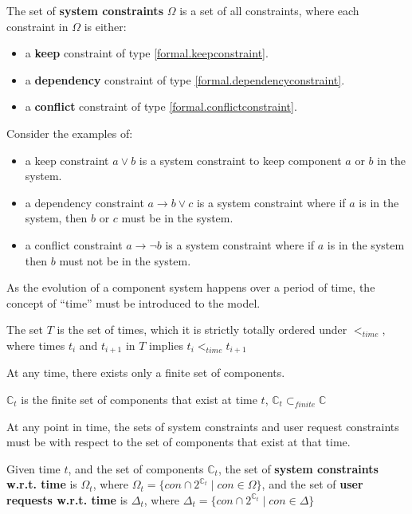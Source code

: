 \begin{defs}
The set of \textbf{system constraints} $\Omega$ is a set of all constraints, where each constraint in $\Omega$ is either: 
\begin{itemize}
  \item a \textbf{keep} constraint of type \ref{formal.keepconstraint}.
  \item a \textbf{dependency} constraint of type \ref{formal.dependencyconstraint}.
  \item a \textbf{conflict} constraint of type \ref{formal.conflictconstraint}.
\end{itemize}
\end{defs}

Consider the examples of:
\begin{itemize}
  \item a keep constraint $a \vee b$ is a system constraint to keep component $a$ or $b$ in the system.
  \item a dependency constraint $a \rightarrow b \vee c$ is a system constraint where if $a$ is in the system, then $b$ or $c$ must be in the system.
  \item a conflict constraint $a \rightarrow \neg b$ is a system constraint where if $a$ is in the system then $b$ must not be in the system.
\end{itemize} 

As the evolution of a component system happens over a period of time, the concept of ``time'' must be introduced to the model.
\begin{defs}
The set $T$ is the set of times, which it is strictly totally ordered under $<_{time}$, where times $t_i$ and $t_{i+1}$ in $T$ implies $t_i <_{time} t_{i+1}$
\end{defs}

At any time, there exists only a finite set of components. 
\begin{defs}
$\mathbb{C}_{t}$ is the finite set of components that exist at time $t$, $\mathbb{C}_{t} \subset_{finite} \mathbb{C}$
\end{defs}

At any point in time, the sets of system constraints and user request constraints must be with respect to the set of components that exist at that time.
\begin{defs}
Given time $t$, and the set of components $\mathbb{C}_{t}$, the set of \textbf{system constraints w.r.t. time} is $\Omega_{t}$, where $\Omega_{t} = \{con \cap 2^{\mathbb{C}_{t}} \mid con \in \Omega\}$,
and the set of \textbf{user requests w.r.t. time} is $\Delta_{t}$, where $\Delta_{t} = \{con \cap 2^{\mathbb{C}_{t}} \mid con \in \Delta\}$
\end{defs}

